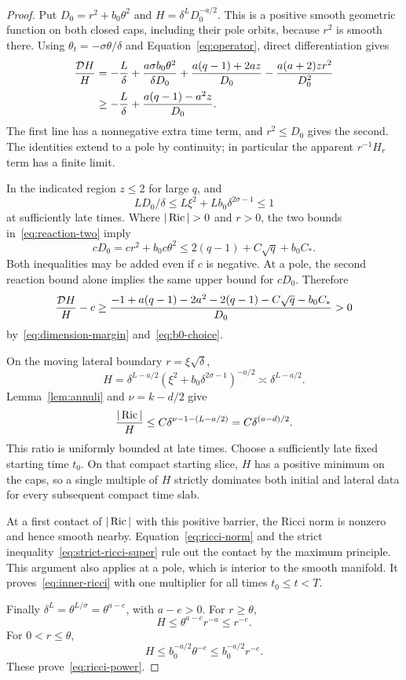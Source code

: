 \begin{proof}
Put \(D_0=r^2+b_0\theta^2\) and \(H=\delta^LD_0^{-a/2}\).
This is a positive smooth geometric function on both closed caps,
including their pole orbits, because \(r^2\) is smooth there.
Using \(\theta_t=-\sigma\theta/\delta\) and
Equation~\eqref{eq:operator}, direct differentiation gives
\begin{equation}\label{eq:inner-barrier-computation}
\begin{split}
\frac{\mathcal D H}{H}
&=-\frac L\delta+\frac{a\sigma b_0\theta^2}{\delta D_0}
 +\frac{a(q-1)+2az}{D_0}-\frac{a(a+2)zr^2}{D_0^2}\\
&\ge-\frac L\delta+\frac{a(q-1)-a^2z}{D_0}.
\end{split}
\end{equation}
The first line has a nonnegative extra time term, and \(r^2\le D_0\)
gives the second. The identities extend to a pole by continuity; in
particular the apparent \(r^{-1}H_r\) term has a finite limit.

In the indicated region \(z\le2\) for large \(q\), and
\[
LD_0/\delta\le L\xi^2+Lb_0\delta^{2\sigma-1}\le1
\]
at sufficiently late times. Where \(|\Ric|>0\) and \(r>0\), the two
bounds in~\eqref{eq:reaction-two} imply
\[
cD_0=cr^2+b_0c\theta^2
\le2(q-1)+C\sqrt q+b_0C_*.
\]
Both inequalities may be added even if \(c\) is negative. At a pole,
the second reaction bound alone implies the same upper bound for
\(cD_0\). Therefore
\begin{equation}\label{eq:strict-ricci-super}
\frac{\mathcal D H}{H}-c
\ge\frac{-1+a(q-1)-2a^2-2(q-1)-C\sqrt q-b_0C_*}{D_0}>0
\end{equation}
by~\eqref{eq:dimension-margin} and~\eqref{eq:b0-choice}.

On the moving lateral boundary \(r=\xi\sqrt\delta\),
\[
H=\delta^{L-a/2}
    (\xi^2+b_0\delta^{2\sigma-1})^{-a/2}
\asymp\delta^{L-a/2}.
\]
Lemma~\ref{lem:annuli} and \(\nu=k-d/2\) give
\begin{equation}\label{eq:lateral-ratio}
\frac{|\operatorname{Ric}|}{H}\le C\delta^{\nu-1-(L-a/2)}
=C\delta^{(a-d)/2}.
\end{equation}
This ratio is uniformly bounded at late times. Choose a sufficiently
late fixed starting time \(t_0\). On that compact starting slice, \(H\)
has a positive minimum on the caps, so a single multiple of \(H\)
strictly dominates both initial and lateral data for every subsequent
compact time slab.

At a first contact of \(|\operatorname{Ric}|\) with this positive barrier, the Ricci
norm is nonzero and hence smooth nearby. Equation~\eqref{eq:ricci-norm}
and the strict inequality~\eqref{eq:strict-ricci-super} rule out the
contact by the maximum principle. This argument also applies at a pole,
which is interior to the smooth manifold. It proves~\eqref{eq:inner-ricci}
with one multiplier for all times \(t_0\le t<T\).

Finally \(\delta^L=\theta^{L/\sigma}=\theta^{a-e}\), with \(a-e>0\).
For \(r\ge\theta\),
\[
H\le\theta^{a-e}r^{-a}\le r^{-e}.
\]
For \(0<r\le\theta\),
\[
H\le b_0^{-a/2}\theta^{-e}\le b_0^{-a/2}r^{-e}.
\]
These prove~\eqref{eq:ricci-power}.
\end{proof}

